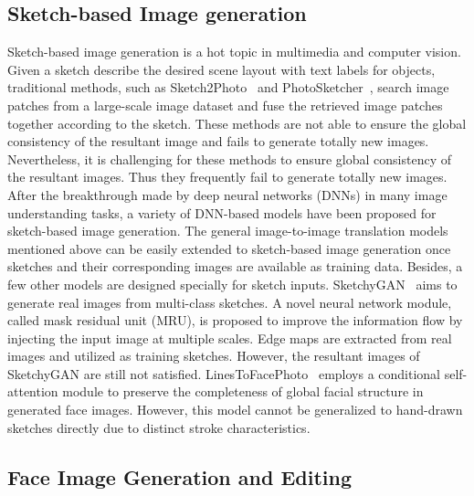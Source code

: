 \subsection{Sketch-based Image generation}
Sketch-based image generation is a hot topic in multimedia and computer vision. Given a sketch describe the desired scene layout with text labels for objects, traditional methods, such as Sketch2Photo~\cite{Sketch2Photo} and PhotoSketcher~\cite{PhotoSketcher}, search image patches from a large-scale image dataset and fuse the retrieved image patches together according to the sketch. These methods are not able to ensure the global consistency of the resultant image and fails to generate totally new images.
%
Nevertheless, it is challenging for these methods to ensure global consistency of the resultant images. Thus they frequently fail to generate totally new images.
%
After the breakthrough made by deep neural networks (DNNs) in many image understanding tasks, a variety of DNN-based models have been proposed for sketch-based image generation. 
%
The general image-to-image translation models mentioned above can be easily extended to sketch-based image generation once sketches and their corresponding images are available as training data. 
%
Besides, a few other models are designed specially for sketch inputs. SketchyGAN~\cite{SketchyGAN} aims to generate real images from multi-class sketches. A novel neural network module, called mask residual unit (MRU), is proposed to improve the information flow by injecting the input image at multiple scales. Edge maps are extracted from real images and utilized as training sketches. However, the resultant images of SketchyGAN are still not satisfied.
%
LinesToFacePhoto~\cite{Lines2Face} employs a conditional self-attention module to preserve the completeness of global facial structure in generated face images.
However, this model cannot be generalized to hand-drawn sketches directly due to distinct stroke characteristics.

\subsection{Face Image Generation and Editing}

